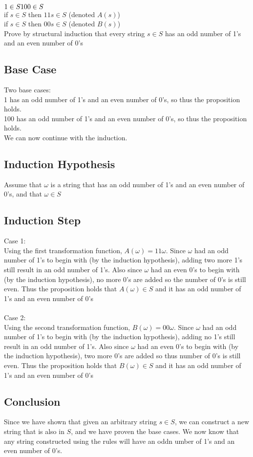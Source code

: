 \documentclass[paper=a4, fontsize=11pt]{scrartcl} %
\numberwithin{equation}{section} %
\numberwithin{figure}{section} %
\numberwithin{table}{section} %
\begin{document}
$1 \in S \\
100 \in S$ \\
if $s \in S$ then $11s \in S$ (denoted $A(s)$)\\
if $s \in S$ then $00s \in S$ (denoted $B(s)$)\\

Prove by structural induction that every string $s \in S$ has an odd number of 1's and an even number of 0's

\subsection{Base Case}

Two base cases: \\
1 has an odd number of 1's and an even number of 0's, so thus the proposition holds.  \\
100 has an odd number of 1's and an even number of 0's, so thus the proposition holds.\\
We can now continue with the induction.
\subsection{Induction Hypothesis}
Assume that $\omega$ is a string that has an odd number of 1's and an even number of 0's, and that $\omega \in S$
\subsection{Induction Step}
Case 1: \\
Using the first transformation function, $A(\omega)=11\omega$. Since $\omega$ had an odd number of 1's to begin with (by the induction hypothesis), adding two more 1's still result in an odd number of 1's. Also since $\omega$ had an even 0's to begin with (by the induction hypothesis), no more 0's are added so the number of 0's is still even. Thus the proposition holds that $A(\omega) \in S$ and it has an odd number of 1's and an even number of 0's \\ 
\\
Case 2: \\
Using the second transformation function, $B(\omega)=00\omega$. Since $\omega$ had an odd number of 1's to begin with (by the induction hypothesis), adding no 1's still result in an odd number of 1's. Also since $\omega$ had an even 0's to begin with (by the induction hypothesis), two more 0's are added so thus number of 0's is still even. Thus the proposition holds that $B(\omega) \in S$ and it has an odd number of 1's and an even number of 0's
\subsection{Conclusion}

Since we have shown that given an arbitrary string $s \in S$, we can construct a new string that is also in $S$, and we have proven the base cases. We now know that any string constructed using the rules will have an oddn umber of 1's and an even number of 0's.



\end{document}
